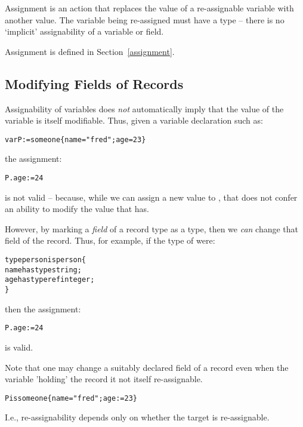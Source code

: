 Assignment is an action that replaces the value of a re-assignable variable with another value. The variable being re-assigned must have a  type -- there is no `implicit' assignability of a variable or field.

Assignment is defined in Section~\vref{assignment}.

\subsection{Modifying Fields of Records}
\label{fieldModify}
Assignability of variables does \emph{not} automatically imply that the value of the variable is itself modifiable. Thus, given a variable declaration such as:
\begin{alltt}
var P := someone\{ name="fred"; age=23 \}
\end{alltt}
the assignment:
\begin{alltt}
P.age := 24
\end{alltt}
is not valid -- because, while we can assign a new value to , that does not confer an ability to modify the value that  has.

However, by marking a \emph{field} of a record type as a  type, then we \emph{can} change that field of the record. Thus, for example, if the type of  were:
\begin{alltt}
type person is person\{
  name has type string;
  age has type ref integer;
\}
\end{alltt}
then the assignment:
\begin{alltt}
P.age := 24
\end{alltt}
is valid.
\begin{aside}
Note that one may change a suitably declared field of a record even when the variable 'holding' the record it not itself re-assignable.
\begin{alltt}
P is someone\{ name="fred"; age := 23 \}
\end{alltt}
I.e., re-assignability depends only on whether the target is re-assignable.
\end{aside}



